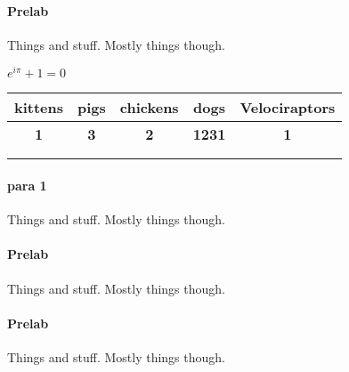 \documentclass[12pt, letterpaper]{article}
\begin{document}
\setlength{\headsep}{50pt}

\vspace{10cm}

	\paragraph{ Prelab}
	{
    Things and stuff. Mostly things though. 

       $e^{i\pi}+1 = 0$
  }


\begin{table}[H]
\begin{tabular}{|c|c|c|c|c|}
\hline
\rowcolor[HTML]{FE996B} 
\textbf{kittens} & \textbf{pigs} & \textbf{chickens} & \textbf{dogs} & \textbf{Velociraptors} \\ \hline
\textbf{1}       & \textbf{3}    & \textbf{2}        & \textbf{1231} & \textbf{1}             \\ \hline
\textbf{}        & \textbf{}     & \textbf{}         & \textbf{}     & \textbf{}              \\ \hline
\textbf{}        & \textbf{}     & \textbf{}         & \textbf{}     & \textbf{}              \\ \hline
\end{tabular}
\end{table}




	\paragraph{ para 1}
	{
    Things and stuff. Mostly things though. 
  }

	\paragraph{ Prelab}
	{
    Things and stuff. Mostly things though. 
  }

	\paragraph{ Prelab}
	{
    Things and stuff. Mostly things though. 
  }


\end{document}
